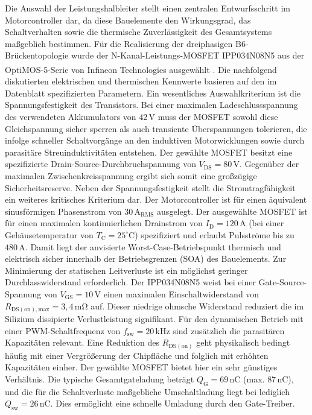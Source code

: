 Die Auswahl der Leistungshalbleiter stellt einen zentralen Entwurfsschritt im Motorcontroller dar, da diese Bauelemente den Wirkungsgrad, das Schaltverhalten sowie die thermische Zuverlässigkeit des Gesamtsystems maßgeblich bestimmen. Für die Realisierung der dreiphasigen B6-Brückentopologie wurde der N-Kanal-Leistungs-MOSFET IPP034N08N5 aus der OptiMOS\textsuperscript{\texttrademark}-5-Serie von Infineon Technologies ausgewählt \cite{DS_IPP034N08N5}. Die nachfolgend diskutierten elektrischen und thermischen Kennwerte basieren auf den im Datenblatt spezifizierten Parametern.
Ein wesentliches Auswahlkriterium ist die Spannungsfestigkeit des Transistors. Bei einer maximalen Ladeschlussspannung des verwendeten Akkumulators von $42\,\mathrm{V}$ muss der MOSFET sowohl diese Gleichspannung sicher sperren als auch transiente Überspannungen tolerieren, die infolge schneller Schaltvorgänge an den induktiven Motorwicklungen sowie durch parasitäre Streuinduktivitäten entstehen. Der gewählte MOSFET besitzt eine spezifizierte Drain-Source-Durchbruchspannung von $V_{\mathrm{DS}} = 80\,\mathrm{V}$. Gegenüber der maximalen Zwischenkreisspannung ergibt sich somit eine großzügige Sicherheitsreserve.
Neben der Spannungsfestigkeit stellt die Stromtragfähigkeit ein weiteres kritisches Kriterium dar. Der Motorcontroller ist für einen äquivalent sinusförmigen Phasenstrom von $30\,\mathrm{A_{RMS}}$ ausgelegt. Der ausgewählte MOSFET ist für einen maximalen kontinuierlichen Drainstrom von $I_{\mathrm{D}} = 120\,\mathrm{A}$ (bei einer Gehäusetemperatur von $T_{\mathrm{C}} = 25^\circ\mathrm{C}$) spezifiziert und erlaubt Pulsströme bis zu $480\,\mathrm{A}$. Damit liegt der anvisierte Worst-Case-Betriebspunkt thermisch und elektrisch sicher innerhalb der Betriebsgrenzen (SOA) des Bauelements.
Zur Minimierung der statischen Leitverluste ist ein möglichst geringer Durchlasswiderstand erforderlich. Der IPP034N08N5 weist bei einer Gate-Source-Spannung von $V_{\mathrm{GS}} = 10\,\mathrm{V}$ einen maximalen Einschaltwiderstand von $R_{\mathrm{DS(on),max}} = 3{,}4\,\mathrm{m\Omega}$ auf. Dieser niedrige ohmsche Widerstand reduziert die im Silizium dissipierte Verlustleistung signifikant.
Für den dynamischen Betrieb mit einer PWM-Schaltfrequenz von $f_{\mathrm{sw}} = 20\,\mathrm{kHz}$ sind zusätzlich die parasitären Kapazitäten relevant. Eine Reduktion des $R_{\mathrm{DS(on)}}$ geht physikalisch bedingt häufig mit einer Vergrößerung der Chipfläche und folglich mit erhöhten Kapazitäten einher. Der gewählte MOSFET bietet hier ein sehr günstiges Verhältnis. Die typische Gesamtgateladung beträgt $Q_{\mathrm{G}} = 69\,\mathrm{nC}$ (max. $87\,\mathrm{nC}$), und die für die Schaltverluste maßgebliche Umschaltladung liegt bei lediglich $Q_{\mathrm{sw}} = 26\,\mathrm{nC}$. Dies ermöglicht eine schnelle Umladung durch den Gate-Treiber. 
